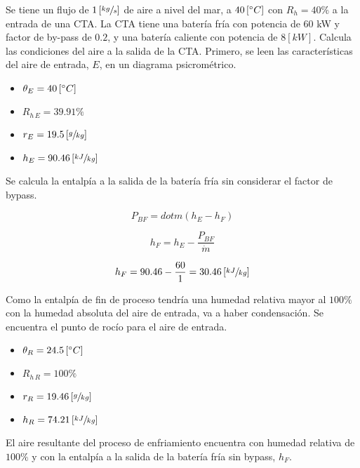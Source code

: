 \documentclass[11pt]{article}
\begin{document}
Se tiene un flujo de $ 1 \left[ \sfrac{ kg }{ s } \right] $ de aire a nivel del mar, a $ 40 \left[ \degree C \right]  $ con $ R_h = 40\% $ a la entrada de una CTA. La CTA tiene una batería fría con potencia de 60 kW y factor de by-pass de $ 0.2 $, y una batería caliente con potencia de $ 8 \left[ kW \right] $. Calcula las condiciones del aire a la salida de la CTA.
Primero, se leen las características del aire de entrada, $ E $, en un diagrama psicrométrico.

\begin{itemize}
    \item
    $ \theta _E = 40 \left[ \degree C \right] $

    \item
    $ R_{ h \, E } = 39.91\% $

    \item
    $ r_E = 19.5 \left[ \sfrac{ g }{ kg } \right] $

    \item
    $ h_E = 90.46 \left[ \sfrac{ kJ }{ kg } \right] $

\end{itemize}

Se calcula la entalpía a la salida de la batería fría sin considerar el factor de bypass.

\[ P_{ BF } = dot{ m } \left( h_E - h_F \right) \]

\[ h_F = h_E - \frac{ P_{ BF } }{ \dot{ m } } \]

\[ h_F = 90.46 - \frac{ 60 }{ 1 } = 30.46 \left[ \sfrac{ kJ }{ kg } \right] \]

Como la entalpía de fin de proceso tendría una humedad relativa mayor al $ 100\% $ con la humedad absoluta del aire de entrada, va a haber condensación. Se encuentra el punto de rocío para el aire de entrada.

\begin{itemize}
    \item
    $ \theta _R = 24.5 \left[ \degree C \right] $

    \item
    $ R_{ h \, R } = 100\% $

    \item
    $ r_R = 19.46 \left[ \sfrac{ g }{ kg } \right] $

    \item
    $ h_R = 74.21 \left[ \sfrac{ kJ }{ kg } \right] $

\end{itemize}

El aire resultante del proceso de enfriamiento encuentra con humedad relativa de  $ 100\% $ y con la entalpía a la salida de la batería fría sin bypass, $ h_F $.
\end{document}
